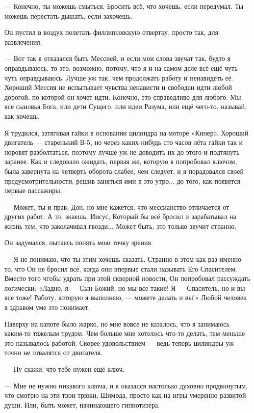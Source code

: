 --- Конечно, ты можешь смыться. Бросить всё, что хочешь, если передумал. Ты можешь перестать дышать, если захочешь.

Он пустил в воздух полетать филлипсовскую отвертку, просто так, для развлечения.

--- Вот так я отказался быть Мессией, и если мои слова звучат так, будто я оправдываюсь, то это,
возможно, потому, что я и на самом деле всё ещё чуть-чуть оправдываюсь. Лучше уж так, чем
продолжать работу и ненавидеть её. Хороший Мессия не испытывает чувства ненависти и свободен идти
любой дорогой, по которой он хочет идти. Конечно, это справедливо для любого. Мы все сыновья Бога,
или дети Сущего, или идеи Разума, или ещё чего-то, называй, как хочешь.

Я трудился, затягивая гайки в основании цилиндра на моторе «Кинер». Хороший двигатель --- старенький В-5, но через каких-нибудь сто часов лёта гайки так и норовят разболтаться, поэтому лучше уж не доводить их до этого и подтянуть заранее. Как и следовало ожидать, первая же, которую я попробовал ключом, была завернута на четверть оборота слабее, чем следует, и я порадовался своей предусмотрительности, решив заняться ими в это утро... до того, как появятся первые пассажиры.

--- Может, ты и прав, Дон, но мне кажется, что мессианство отличается от других работ. А то,
знаешь, Иисус, Который бы всё бросил и зарабатывал на жизнь тем, что заколачивал гвозди... Может быть, это только звучит странно.

Он задумался, пытаясь понять мою точку зрения.

--- Я не понимаю, что ты этим хочешь сказать. Странно в этом как раз именно то, что Он не бросил
всё, когда они впервые стали называть Его Спасителем. Вместо того чтобы удрать при этой скверной
новости, Он попробовал рассуждать логически: «Ладно, я --- Сын Божий, но мы все такие! Я ---
Спаситель, но и вы все тоже! Работу, которую я выполняю, --- можете делать и вы!» Любой человек в здравом уме это понимает.

Наверху на капоте было жарко, но мне вовсе не казалось, что я занимаюсь каким-то тяжелым трудом. Чем больше мне хотелось что-то делать, тем меньше это называлось работой. Скорее удовольствием --- ведь теперь цилиндры уж точно не отвалятся от двигателя.

--- Ну скажи, что тебе нужен ещё ключ.

--- Мне не нужно никакого ключа, и я оказался настолько духовно продвинутым, что смотрю на эти
твои трюки, Шимода, просто как на игры умеренно развитой души. Или, быть может, начинающего
гипнотизёра.

